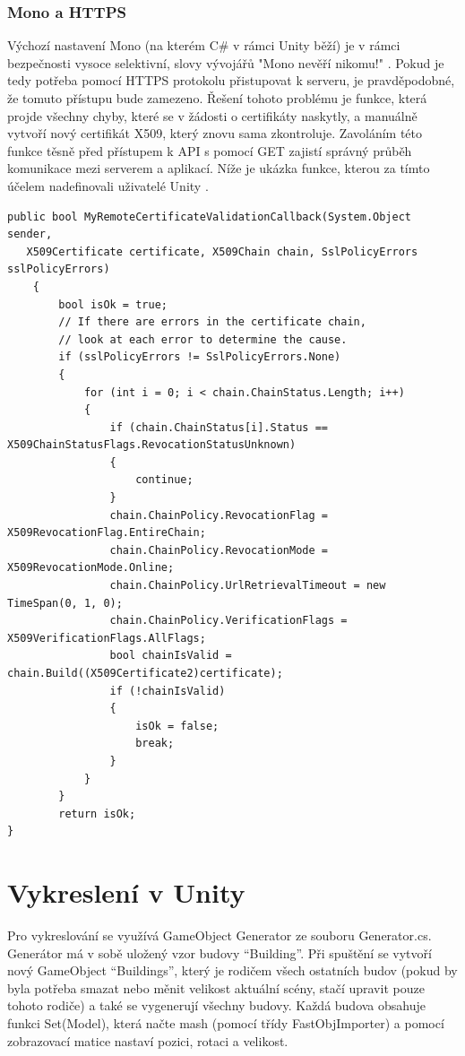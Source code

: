 \documentclass[thesis=B,czech]{FITthesis}[2012/06/26]
\begin{document}
	\subsubsection{Mono a HTTPS}
	
	Výchozí nastavení Mono (na kterém C\# v rámci Unity běží) je v rámci bezpečnosti vysoce selektivní, slovy vývojářů "Mono nevěří nikomu!" \cite{mono}. Pokud je tedy potřeba pomocí HTTPS protokolu přistupovat k serveru, je pravděpodobné, že tomuto přístupu bude zamezeno. Řešení tohoto problému je funkce, která projde všechny chyby, které se v žádosti o certifikáty naskytly, a manuálně vytvoří nový certifikát X509, který znovu sama zkontroluje. Zavoláním této funkce těsně před přístupem k API s pomocí GET zajistí správný průběh komunikace mezi serverem a aplikací. Níže je ukázka funkce, kterou za tímto účelem nadefinovali uživatelé Unity \cite{unityFAQ}.
	
	\begin{lstlisting}[frame=single]
public bool MyRemoteCertificateValidationCallback(System.Object sender,
   X509Certificate certificate, X509Chain chain, SslPolicyErrors sslPolicyErrors)
    {
        bool isOk = true;
        // If there are errors in the certificate chain,
        // look at each error to determine the cause.
        if (sslPolicyErrors != SslPolicyErrors.None)
        {
            for (int i = 0; i < chain.ChainStatus.Length; i++)
            {
                if (chain.ChainStatus[i].Status == X509ChainStatusFlags.RevocationStatusUnknown)
                {
                    continue;
                }
                chain.ChainPolicy.RevocationFlag = X509RevocationFlag.EntireChain;
                chain.ChainPolicy.RevocationMode = X509RevocationMode.Online;
                chain.ChainPolicy.UrlRetrievalTimeout = new TimeSpan(0, 1, 0);
                chain.ChainPolicy.VerificationFlags = X509VerificationFlags.AllFlags;
                bool chainIsValid = chain.Build((X509Certificate2)certificate);
                if (!chainIsValid)
                {
                    isOk = false;
                    break;
                }
            }
        }
        return isOk;
}
	\end{lstlisting}
	
	\section{Vykreslení v Unity}
    Pro vykreslování se využívá GameObject Generator ze souboru Generator.cs. Generátor má v sobě uložený vzor budovy “Building”. Při spuštění se vytvoří nový GameObject “Buildings”, který je rodičem všech ostatních budov (pokud by byla potřeba smazat nebo měnit velikost aktuální scény, stačí upravit pouze tohoto rodiče) a také se vygenerují všechny budovy. Každá budova obsahuje funkci Set(Model), která načte mash (pomocí třídy FastObjImporter) a pomocí zobrazovací matice nastaví pozici, rotaci a velikost.
    
\end{document}
